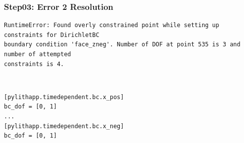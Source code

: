 \documentclass{beamer}
\begin{document}
\begin{frame}[fragile]
  \frametitle{Step03: Error 2 Resolution}

\begin{lstlisting}
RuntimeError: Found overly constrained point while setting up constraints for DirichletBC
boundary condition 'face_zneg'. Number of DOF at point 535 is 3 and number of attempted
constraints is 4.
\end{lstlisting}\pause
{} \pause\\
\begin{lstlisting}
[pylithapp.timedependent.bc.x_pos]
bc_dof = [0, 1]
...
[pylithapp.timedependent.bc.x_neg]
bc_dof = [0, 1]
\end{lstlisting}

\end{frame}
\end{document}
